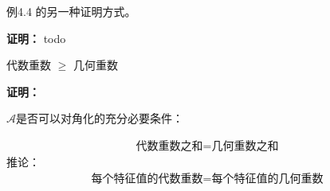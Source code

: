 \documentclass{article}
\begin{document}
\begin{zremark}
  例4.4 的另一种证明方式。
\end{zremark}

\textbf{证明：}
todo

\begin{zremark}
  代数重数 $\geq$ 几何重数
\end{zremark}

\textbf{证明：}

\begin{zremark}
  $\mathscr{A}$是否可以对角化的充分必要条件：

  \begin{align*}
    \textbf{代数重数之和} = \textbf{几何重数之和}
  \end{align*}
  推论：
  \begin{align*}
    \textbf{每个特征值的代数重数} = \textbf{每个特征值的几何重数}
  \end{align*}

\end{zremark}
\end{document}

